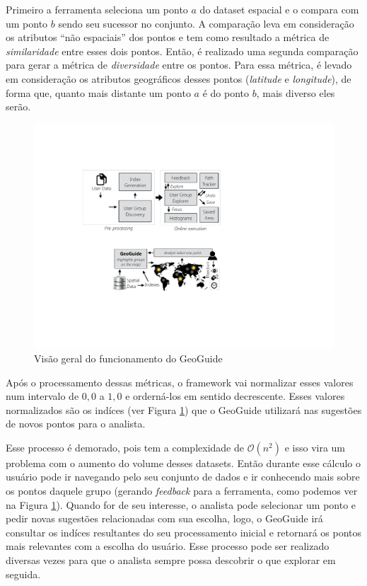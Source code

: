 Primeiro a ferramenta seleciona um ponto $a$ do dataset espacial e o compara com um ponto $b$ sendo seu sucessor no conjunto. A comparação leva em consideração os atributos ``não espaciais'' dos pontos e tem como resultado a métrica de \textit{similaridade} entre esses dois pontos. Então, é realizado uma segunda comparação para gerar a métrica de \textit{diversidade} entre os pontos. Para essa métrica, é levado em consideração os atributos geográficos desses pontos (\textit{latitude} e \textit{longitude}), de forma que, quanto mais distante um ponto $a$ é do ponto $b$, mais diverso eles serão.  

\begin{figure}[h]
	\centering
	\includegraphics[width=\textwidth]{images/geoguide-pre-processamento.pdf}
	\caption{Visão geral do funcionamento do GeoGuide}
	\label{fig:geoguide-pre-processamento}
	\vspace{-10pt}
\end{figure}

Após o processamento dessas métricas, o framework vai normalizar esses valores num intervalo de $0,0$ a $1,0$ e orderná-los em sentido decrescente. Esses valores normalizados são os indíces (ver Figura \ref{fig:geoguide-pre-processamento}) que o GeoGuide utilizará nas sugestões de novos pontos para o analista.

Esse processo é demorado, pois tem a complexidade de $\mathcal{O}(n^{2})$ e isso vira um problema com o aumento do volume desses datasets. Então durante esse cálculo o usuário pode ir navegando pelo seu conjunto de dados e ir conhecendo mais sobre os pontos daquele grupo (gerando \textit{feedback} para a ferramenta, como podemos ver na Figura \ref{fig:geoguide-pre-processamento}). Quando for de seu interesse, o analista pode selecionar um ponto e pedir novas sugestões relacionadas com sua escolha, logo, o GeoGuide irá consultar os indíces resultantes do seu processamento inicial e retornará os pontos mais relevantes com a escolha do usuário. Esse processo pode ser realizado diversas vezes para que o analista sempre possa descobrir o que explorar em seguida.

